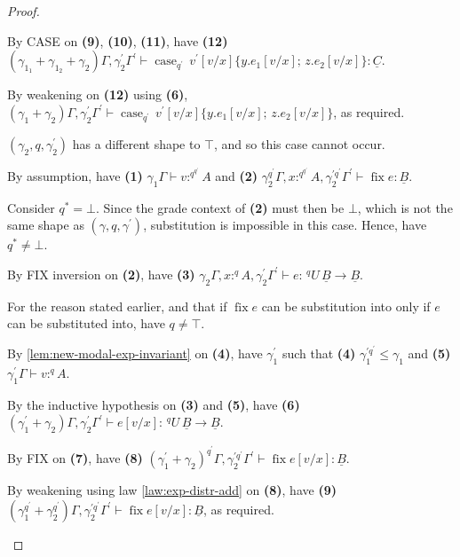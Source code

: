 \documentclass[acmsmall,screen,nonacm]{acmart}
\DeclareMathOperator{\case}{\text{case}}
\DeclareMathOperator{\while}{\text{while}}
\DeclareMathOperator{\fix}{\text{fix}}
\newcommand{\tee}{\vdash}
\begin{document}
\begin{proof}
\begin{description}
    By CASE on \textbf{(9)}, \textbf{(10)}, \textbf{(11)}, have \textbf{(12)} $(\gamma_{1_1} + \gamma_{1_2} + \gamma_2)\Gamma, \gamma_2^\prime\Gamma^\prime \tee \case_{q^\prime} \, v^\prime[v/x] \{y.e_1[v/x]; \, z.e_2[v/x]\} : \underline{C}$.
    
    By weakening on \textbf{(12)} using \textbf{(6)}, $(\gamma_1 + \gamma_2)\Gamma, \gamma_2^\prime\Gamma^\prime \tee \case_{q^\prime} \, v^\prime[v/x] \{y.e_1[v/x]; \, z.e_2[v/x]\}$, as required.
    \\
    \item[Case ABSURD.]
    $(\gamma_2, q, \gamma_2^\prime)$ has a different shape to $\top$, and so this case cannot occur.
    \\
    \item[Case FIX.]
    By assumption, have \textbf{(1)} $\gamma_1\Gamma \tee v :^{q^{q^\prime}} A$ and \textbf{(2)} $\gamma_2^{q^\prime}\Gamma, x :^{q^{q^\prime}} A, \gamma_2^{\prime{q^\prime}} \Gamma^\prime \tee \fix e : \underline{B}$.

    Consider $q^* = \bot$.
    Since the grade context of \textbf{(2)} must then be $\bot$, which is not the same shape as $(\gamma, q, \gamma^\prime)$, substitution is impossible in this case. 
    Hence, have $q^* \ne \bot$.
    
    By FIX inversion on \textbf{(2)}, have \textbf{(3)} $\gamma_2\Gamma, x :^q A, \gamma_2^\prime\Gamma^\prime \tee e : \,^q U \, \underline{B} \rightarrow \underline{B}$.

    For the reason stated earlier, and that if $\fix e$ can be substitution into only if $e$ can be substituted into, have $q \ne \top$.
    
    By \ref{lem:new-modal-exp-invariant} on \textbf{(4)}, have $\gamma_1^\prime$ such that \textbf{(4)} $\gamma_1^{\prime{q^\prime}} \le \gamma_1$ and \textbf{(5)} $\gamma_1^\prime\Gamma \tee v :^q A$.

    By the inductive hypothesis on \textbf{(3)} and \textbf{(5)}, have \textbf{(6)} $(\gamma_1^\prime + \gamma_2)\Gamma, \gamma_2^\prime\Gamma^\prime \tee e[v/x] : \,^q U \, \underline{B} \rightarrow \underline{B}$.

    By FIX on \textbf{(7)}, have \textbf{(8)} $(\gamma_1^\prime + \gamma_2)^{q^\prime}\Gamma, \gamma_2^{\prime{q^\prime}}\Gamma^\prime \tee \fix e[v/x] : \underline{B}$.

    By weakening using law \ref{law:exp-distr-add} on \textbf{(8)}, have \textbf{(9)} $(\gamma_1^{q^\prime} + \gamma_2^{q^\prime})\Gamma, \gamma_2^{\prime{q^\prime}}\Gamma^\prime \tee \fix e[v/x] : \underline{B}$, as required.
    \\
    \item[Case WHILE TODO.]


\end{description}
\end{proof}
\end{document}
